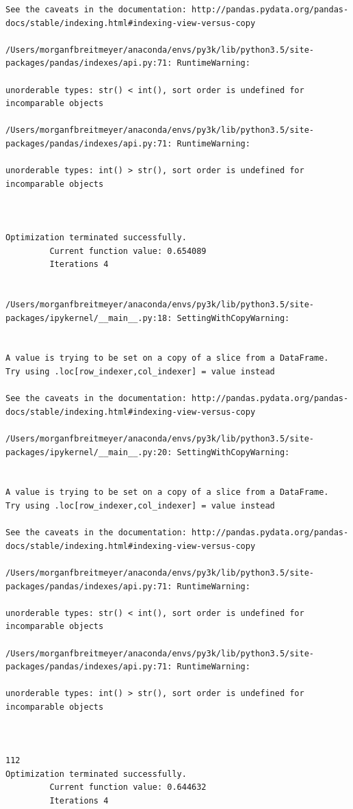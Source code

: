 \begin{lstlisting}
See the caveats in the documentation: http://pandas.pydata.org/pandas-docs/stable/indexing.html#indexing-view-versus-copy

/Users/morganfbreitmeyer/anaconda/envs/py3k/lib/python3.5/site-packages/pandas/indexes/api.py:71: RuntimeWarning:

unorderable types: str() < int(), sort order is undefined for incomparable objects

/Users/morganfbreitmeyer/anaconda/envs/py3k/lib/python3.5/site-packages/pandas/indexes/api.py:71: RuntimeWarning:

unorderable types: int() > str(), sort order is undefined for incomparable objects



Optimization terminated successfully.
         Current function value: 0.654089
         Iterations 4


/Users/morganfbreitmeyer/anaconda/envs/py3k/lib/python3.5/site-packages/ipykernel/__main__.py:18: SettingWithCopyWarning:


A value is trying to be set on a copy of a slice from a DataFrame.
Try using .loc[row_indexer,col_indexer] = value instead

See the caveats in the documentation: http://pandas.pydata.org/pandas-docs/stable/indexing.html#indexing-view-versus-copy

/Users/morganfbreitmeyer/anaconda/envs/py3k/lib/python3.5/site-packages/ipykernel/__main__.py:20: SettingWithCopyWarning:


A value is trying to be set on a copy of a slice from a DataFrame.
Try using .loc[row_indexer,col_indexer] = value instead

See the caveats in the documentation: http://pandas.pydata.org/pandas-docs/stable/indexing.html#indexing-view-versus-copy

/Users/morganfbreitmeyer/anaconda/envs/py3k/lib/python3.5/site-packages/pandas/indexes/api.py:71: RuntimeWarning:

unorderable types: str() < int(), sort order is undefined for incomparable objects

/Users/morganfbreitmeyer/anaconda/envs/py3k/lib/python3.5/site-packages/pandas/indexes/api.py:71: RuntimeWarning:

unorderable types: int() > str(), sort order is undefined for incomparable objects



112
Optimization terminated successfully.
         Current function value: 0.644632
         Iterations 4



\end{lstlisting}
